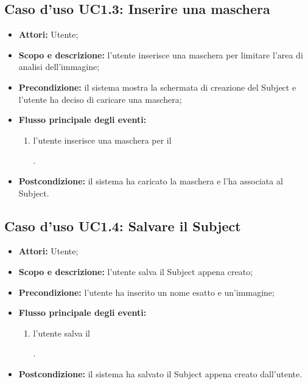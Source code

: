 \subsection{Caso d'uso UC1.3: Inserire una maschera}
\begin{itemize}
\item \textbf{Attori:} Utente;
\item \textbf{Scopo e descrizione:} l'utente inserisce una maschera\glossario{} per limitare l'area di analisi dell'immagine;
\item \textbf{Precondizione:} il sistema mostra la schermata di creazione del Subject\glossario{} e l'utente ha deciso di caricare una maschera\glossario{};
\item \textbf{Flusso principale degli eventi:}
\begin{enumerate}
\item l'utente inserisce una maschera\glossario{} per il \subject{}.
\end{enumerate}
\item \textbf{Postcondizione:} il sistema ha caricato la maschera\glossario{} e l'ha associata al Subject\glossario{}.
\end{itemize}

\subsection{Caso d'uso UC1.4: Salvare il Subject}
\begin{itemize}
\item \textbf{Attori:} Utente;
\item \textbf{Scopo e descrizione:} l'utente salva il Subject\glossario{} appena creato;
\item \textbf{Precondizione:} l'utente ha inserito un nome esatto e un'immagine;
\item \textbf{Flusso principale degli eventi:}
\begin{enumerate}
\item l'utente salva il \subject{}.
\end{enumerate}
\item \textbf{Postcondizione:} il sistema ha salvato il Subject\glossario{} appena creato dall'utente.
\end{itemize}

